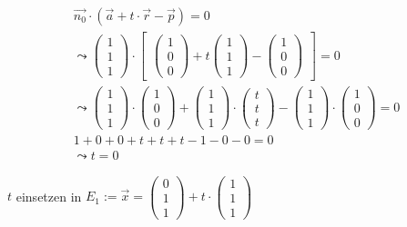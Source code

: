 \begin{gather}
\vec{n_0} \cdot (\vec{a}+t\cdot \vec{r}-\vec{p})=0\\
\leadsto 
\begin{pmatrix}
1\\1\\1
\end{pmatrix} \cdot 
\begin{bmatrix}
\begin{pmatrix}
1\\0\\0
\end{pmatrix}
+ t
\begin{pmatrix}
1\\1\\1
\end{pmatrix}
-
\begin{pmatrix}
1\\0\\0
\end{pmatrix}
\end{bmatrix} = 0\\
\leadsto
\begin{pmatrix}
1\\1\\1
\end{pmatrix}\cdot
\begin{pmatrix}
1\\0\\0
\end{pmatrix}
+
\begin{pmatrix}
1\\1\\1
\end{pmatrix}
\cdot
\begin{pmatrix}
t\\t\\t
\end{pmatrix}
-
\begin{pmatrix}
1\\1\\1
\end{pmatrix}
\cdot
\begin{pmatrix}
1\\0\\0
\end{pmatrix} =0\\
1+0+0+t+t+t-1-0-0=0\\
\leadsto t=0
\end{gather}

\ensuremath{t} einsetzen in \ensuremath{E_1:= \vec{x}=\begin{pmatrix}
		0\\1\\1
	\end{pmatrix} +t\cdot\begin{pmatrix}
		1\\1\\1
\end{pmatrix}}\\

